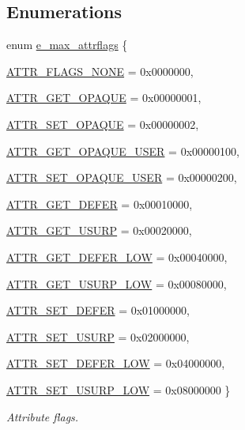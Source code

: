 \subsection*{Enumerations}
\begin{DoxyCompactItemize}
\item 
enum \hyperlink{group__attr_gaf296cfc6741bb19207f6ed8062809115}{e\_\-max\_\-attrflags} \{ \par
\hyperlink{group__attr_ggaf296cfc6741bb19207f6ed8062809115a01444a3ba8b6597d8647db9b6f1e4d17}{ATTR\_\-FLAGS\_\-NONE} =  0x0000000, 
\par
\hyperlink{group__attr_ggaf296cfc6741bb19207f6ed8062809115a47394f3cd34edec309f07f321818cc8b}{ATTR\_\-GET\_\-OPAQUE} =  0x00000001, 
\par
\hyperlink{group__attr_ggaf296cfc6741bb19207f6ed8062809115a048051c113f373751a2a72764f3c924d}{ATTR\_\-SET\_\-OPAQUE} =  0x00000002, 
\par
\hyperlink{group__attr_ggaf296cfc6741bb19207f6ed8062809115a1b88cd18f871ecd713f291b3ec4bc464}{ATTR\_\-GET\_\-OPAQUE\_\-USER} =  0x00000100, 
\par
\hyperlink{group__attr_ggaf296cfc6741bb19207f6ed8062809115a82e9ec2c8a764eaa9f1fed1bcf611318}{ATTR\_\-SET\_\-OPAQUE\_\-USER} =  0x00000200, 
\par
\hyperlink{group__attr_ggaf296cfc6741bb19207f6ed8062809115a4c62cd34ebba601f635f8998d2e8bd00}{ATTR\_\-GET\_\-DEFER} =  0x00010000, 
\par
\hyperlink{group__attr_ggaf296cfc6741bb19207f6ed8062809115a6f621b7aed25b0a4489fb99d618075de}{ATTR\_\-GET\_\-USURP} =  0x00020000, 
\par
\hyperlink{group__attr_ggaf296cfc6741bb19207f6ed8062809115af657afba5a7b08438980788cc0dba02c}{ATTR\_\-GET\_\-DEFER\_\-LOW} =  0x00040000, 
\par
\hyperlink{group__attr_ggaf296cfc6741bb19207f6ed8062809115ad3791455a3bd775f02ed5b571a394f44}{ATTR\_\-GET\_\-USURP\_\-LOW} =  0x00080000, 
\par
\hyperlink{group__attr_ggaf296cfc6741bb19207f6ed8062809115abbc30163a3d643a145299509fbac41ea}{ATTR\_\-SET\_\-DEFER} =  0x01000000, 
\par
\hyperlink{group__attr_ggaf296cfc6741bb19207f6ed8062809115afdd45e761f2f86cec9fb26db0e6c16ca}{ATTR\_\-SET\_\-USURP} =  0x02000000, 
\par
\hyperlink{group__attr_ggaf296cfc6741bb19207f6ed8062809115ab12301ae2bbf46599ccee979b0e53879}{ATTR\_\-SET\_\-DEFER\_\-LOW} =  0x04000000, 
\par
\hyperlink{group__attr_ggaf296cfc6741bb19207f6ed8062809115af5c738544e75ccc1da02e19e3387a9c8}{ATTR\_\-SET\_\-USURP\_\-LOW} =  0x08000000
 \}
\begin{DoxyCompactList}\small\item\em Attribute flags. \item\end{DoxyCompactList}\end{DoxyCompactItemize}
